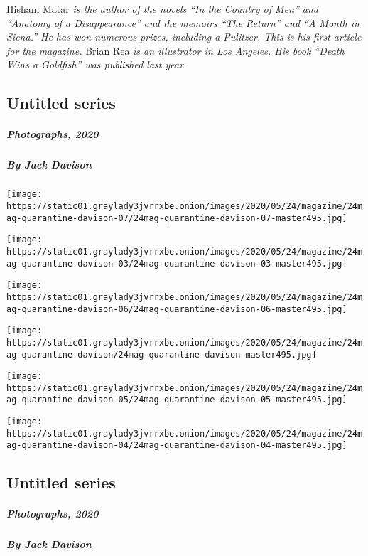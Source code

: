 Hisham Matar \emph{is the author of the novels ``In the Country of Men''
and ``Anatomy of a Disappearance'' and the memoirs ``The Return'' and
``A Month in Siena.'' He has won numerous prizes, including a Pulitzer.
This is his first article for the magazine.} Brian Rea \emph{is an
illustrator in Los Angeles. His book ``Death Wins a Goldfish'' was
published last year.}

\hypertarget{untitled-series-2}{%
\subsection{Untitled series}\label{untitled-series-2}}

\hypertarget{photographs-2020-2}{%
\subparagraph{Photographs, 2020}\label{photographs-2020-2}}

\hypertarget{by-jack-davison-2}{%
\subparagraph{By Jack Davison}\label{by-jack-davison-2}}

\texttt{[image: https://static01.graylady3jvrrxbe.onion/images/2020/05/24/magazine/24mag-quarantine-davison-07/24mag-quarantine-davison-07-master495.jpg]}

\texttt{[image: https://static01.graylady3jvrrxbe.onion/images/2020/05/24/magazine/24mag-quarantine-davison-03/24mag-quarantine-davison-03-master495.jpg]}

\texttt{[image: https://static01.graylady3jvrrxbe.onion/images/2020/05/24/magazine/24mag-quarantine-davison-06/24mag-quarantine-davison-06-master495.jpg]}

\texttt{[image: https://static01.graylady3jvrrxbe.onion/images/2020/05/24/magazine/24mag-quarantine-davison/24mag-quarantine-davison-master495.jpg]}

\texttt{[image: https://static01.graylady3jvrrxbe.onion/images/2020/05/24/magazine/24mag-quarantine-davison-05/24mag-quarantine-davison-05-master495.jpg]}

\texttt{[image: https://static01.graylady3jvrrxbe.onion/images/2020/05/24/magazine/24mag-quarantine-davison-04/24mag-quarantine-davison-04-master495.jpg]}

\hypertarget{untitled-series-3}{%
\subsection{Untitled series}\label{untitled-series-3}}

\hypertarget{photographs-2020-3}{%
\subparagraph{Photographs, 2020}\label{photographs-2020-3}}

\hypertarget{by-jack-davison-3}{%
\subparagraph{By Jack Davison}\label{by-jack-davison-3}}

